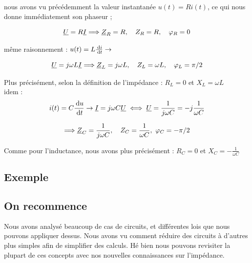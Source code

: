 \documentclass[12pt,a4paper]{article}
\newcommand{\uz}{\uline{Z} }
\newcommand{\uu}{\uline{U} }
\begin{document}
  nous avons vu précédemment la valeur instantanée $u(t) = Ri(t)$, ce qui nous donne immédiatement son phaseur ; 
\begin{boite}
	\begin{equation}
		\uu = R\uline{I}\Longrightarrow \uz_R = R, \quad Z_R = R, \quad \varphi_R = 0
		\label{equ: impedance resistance}
	\end{equation}
\end{boite}
 même raisonnement : $u(t) = L\frac{\, \mathrm d i}{\, \mathrm d t} \to $
\begin{boite}
	\begin{equation}
		\uu = j\omega L\uline{I} \Longrightarrow \uz_L = j\omega L, \quad Z_L = \omega L, \quad \varphi_L = \pi/2
		\label{equ: impedance inductance}
	\end{equation}
\end{boite}
Plus précisément, selon la définition de l'impédance : $R_L = 0$ et $X_L = \omega L$\\
 idem :\[i(t) = C\frac{\deriv{u}}{\deriv{t}} \to \uline{I} = j\omega C \uu \iff \uu = \frac{1}{j\omega C} = -j\frac{1}{\omega C}\]
\begin{boite}
	\begin{equation}
		\Longrightarrow \uz_C = \frac{1}{j\omega C}, \quad Z_C = \frac{1}{\omega C},\ \varphi_C = -\pi/2
		\label{equ: impedance capacite}
	\end{equation}
\end{boite}
Comme pour l'inductance, nous avons plus précisément : $R_C = 0$ et $X_C = -\frac{1}{\omega C}$
\subsection{Exemple}

\subsection{On recommence}
Nous avons analysé beaucoup de cas de circuits, et différentes lois que nous pouvons appliquer dessus. Nous avons vu comment réduire des circuits à d'autres plus simples afin de simplifier des calculs. Hé bien nous pouvons revisiter la plupart de ces concepts avec nos nouvelles connaissances sur l'impédance.
\end{document}
